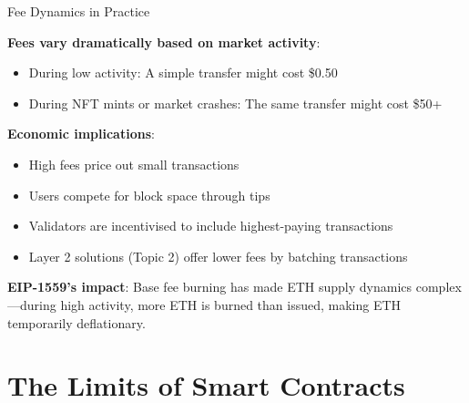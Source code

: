 \documentclass[10pt]{beamer}
\begin{document}
\begin{frame}{Fee Dynamics in Practice}
  
  \textbf{Fees vary dramatically based on market activity}:
  \begin{itemize}
    \item During low activity: A simple transfer might cost \$0.50
    \item During NFT mints or market crashes: The same transfer might cost \$50+
  \end{itemize}
  
  \vspace{1em}
  \textbf{Economic implications}:
  \begin{itemize}
    \item High fees price out small transactions
    \item Users compete for block space through tips
    \item Validators are incentivised to include highest-paying transactions
    \item Layer 2 solutions (Topic 2) offer lower fees by batching transactions
  \end{itemize}
  
  \vspace{1em}
  \textbf{EIP-1559's impact}: Base fee burning has made ETH supply dynamics complex---during high activity, more ETH is burned than issued, making ETH temporarily deflationary.
\end{frame}

\section{The Limits of Smart Contracts}
\end{document}
